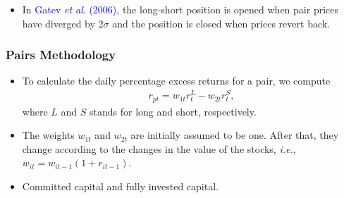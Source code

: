 \documentclass[pdf,9pt,xcolor=dvipsnames,hide notes]{beamer}
\begin{document}
\begin{frame}[label=frame2c]
\begin{itemize}
\pause 

\item In \textcolor{blue}{Gatev \emph{et al}}. \textcolor{blue}{(2006)}, the long-short position is opened when pair prices have diverged by 2$\sigma$ and the position is closed when prices revert back.


\end{itemize}

\end{frame}

\begin{frame}[label=frame3]
	\frametitle{Pairs Methodology}
	
	
	\begin{itemize}
		\justifying
		\item To calculate the daily percentage excess returns for a pair, we compute
		\begin{equation}
		\begin{aligned}
		r_{pt}=w_{1t}r_{t}^{L}-w_{2t}r_{t}^{S},
		\end{aligned}
		\label{eq:eq01}
		\end{equation}
		where $L$ and $S$ stands for long and short, respectively. 
		
		\vspace{0.3cm}
		
		
		\item The weights $w_{1t}$ and $w_{2t}$ are initially assumed to be one. After that, they change according to the changes in the value of the stocks, \emph{i.e.}, $w_{it}=w_{it-1}(1+r_{it-1})$.
		
		\vspace{0.3cm}
		
		\pause
		\item  Committed capital and fully invested capital. 
	
	\end{itemize}
	
\end{frame}
\end{document}
